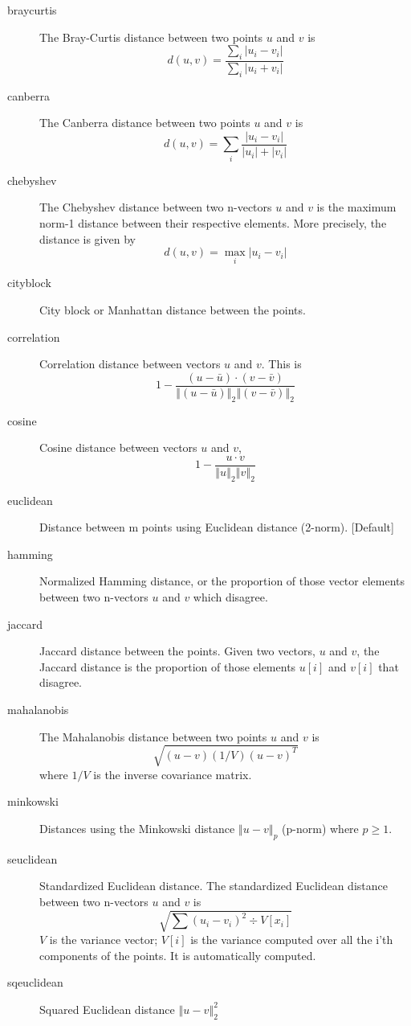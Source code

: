 \documentclass[11pt,a4paper,english]{article}
\numberwithin{equation}{section}
\begin{document}
\begin{description}
\begin{description}
\item[braycurtis] The Bray-Curtis distance between two points $u$ and
$v$ is 
\[
d(u,v)=\frac{\sum_{i}\left|u_{i}-v_{i}\right|}{\sum_{i}\left|u_{i}+v_{i}\right|}
\]
\item[canberra] The Canberra distance between two points $u$ and $v$
is
\[
d(u,v)=\underset{i}{\sum}\frac{\left|u_{i}-v_{i}\right|}{\left|u_{i}\right|+\left|v_{i}\right|}
\]
\item[chebyshev] The Chebyshev distance between two n-vectors $u$ and
$v$ is the maximum norm-1 distance between their respective elements.
More precisely, the distance is given by
\[
d(u,v)=\underset{i}{\max}\left|u_{i}-v_{i}\right|
\]
\item[cityblock] City block or Manhattan distance between the points.
\item[correlation] Correlation distance between vectors $u$ and $v$.
This is
\[
1-\frac{(u-\bar{u})\cdot (v-\bar{v})}{\left\Vert (u-\bar{u})\right\Vert _{2}\left\Vert (v-\bar{v})\right\Vert _{2}}
\]
\item[cosine] Cosine distance between vectors $u$ and $v$, 
\[
1-\frac{u\cdot v}{\left\Vert u\right\Vert _{2}\left\Vert v\right\Vert _{2}}
\]
\item[euclidean] Distance between m points using Euclidean distance
(2-norm). {[}Default{]}
\item[hamming] Normalized Hamming distance, or the proportion of those
vector elements between two n-vectors $u$ and $v$ which disagree.
\item[jaccard] Jaccard distance between the points. Given two vectors,
$u$ and $v$, the Jaccard distance is the proportion of those elements
$u[i]$ and $v[i]$ that disagree.
\item[mahalanobis] The Mahalanobis distance between two points $u$
and $v$ is
\[
\sqrt{(u-v)(1/V)(u-v)^{T}}
\]
where $1/V$ is the inverse covariance matrix.
\item[minkowski] Distances using the Minkowski distance $\left\Vert u-v\right\Vert _{p}$
(p-norm) where $p\geq1$.
\item[seuclidean] Standardized Euclidean distance. The standardized
Euclidean distance between two n-vectors $u$ and $v$ is
\[
\sqrt{\sum\left(u_{i}-v_{i}\right)^{2}\div V\left[x_{i}\right]}
\]
$V$ is the variance vector; $V[i]$ is the variance computed over
all the i’th components of the points. It is automatically computed.
\item[sqeuclidean] Squared Euclidean distance $\left\Vert u-v\right\Vert _{2}^{2}$

\end{description}
\end{description}
\end{document}
